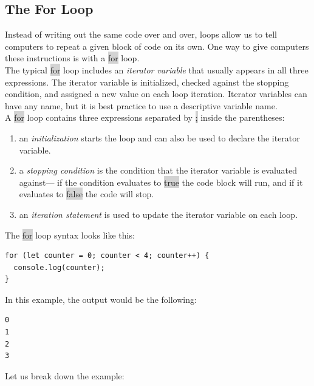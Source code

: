 \documentclass[11pt]{article}
\begin{document}
\subsection{The For Loop}
Instead of writing out the same code over and over, loops allow us to tell computers to repeat a given block of code on its own. One way to give computers these instructions is with a \colorbox{lightgray}{for} loop. \\
\newline
The typical \colorbox{lightgray}{for} loop includes an \textit{iterator variable} that usually appears in all three expressions. The iterator variable is initialized, checked against the stopping condition, and assigned a new value on each loop iteration. Iterator variables can have any name, but it is best practice to use a descriptive variable name. \\
\newline
A \colorbox{lightgray}{for} loop contains three expressions separated by \colorbox{lightgray}{;} inside the parentheses:
\begin{enumerate}[leftmargin = *]
\item an \textit{initialization} starts the loop and can also be used to declare the iterator variable.
\item a \textit{stopping condition} is the condition that the iterator variable is evaluated against— if the condition evaluates to \colorbox{lightgray}{true} the code block will run, and if it evaluates to \colorbox{lightgray}{false} the code will stop.
\item an \textit{iteration statement} is used to update the iterator variable on each loop.
\end{enumerate}
The \colorbox{lightgray}{for} loop syntax looks like this:
\begin{lstlisting}
for (let counter = 0; counter < 4; counter++) {
  console.log(counter);
}
\end{lstlisting}
In this example, the output would be the following:
\begin{lstlisting}
0
1
2
3
\end{lstlisting}
Let us break down the example:
\end{document}
